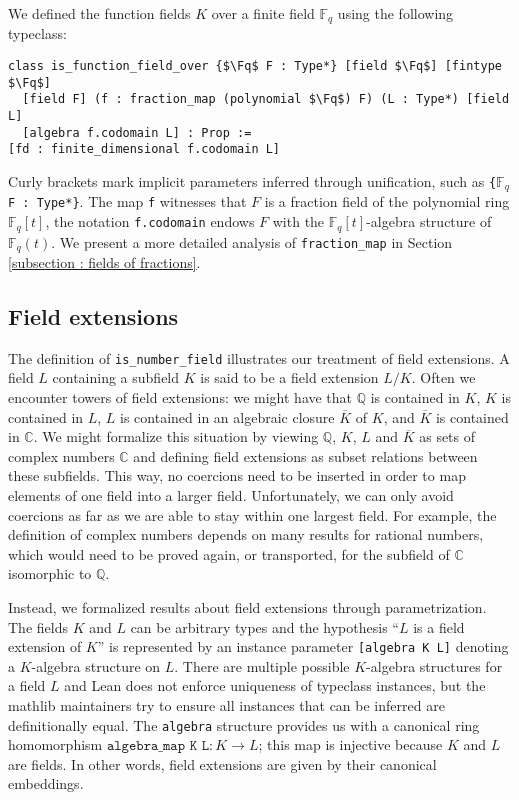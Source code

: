 \documentclass[a4paper,USenglish,cleveref, autoref, thm-restate]{lipics-v2021}
\newcommand{\C}{\mathbb{C}}
\newcommand{\lean}[1]{\texttt{#1}\xspace} %
\newcommand*{\Fq}[1][q]{\mathbb{F}_{#1}}
\newcommand{\mathlib}{\textsf{mathlib}\xspace}
\newcommand{\Q}{\mathbb{Q}}
\begin{document}
We defined the function fields $K$ over a finite field $\Fq$ using the following typeclass:
\begin{lstlisting}
class is_function_field_over {$\Fq$ F : Type*} [field $\Fq$] [fintype $\Fq$]
  [field F] (f : fraction_map (polynomial $\Fq$) F) (L : Type*) [field L]
  [algebra f.codomain L] : Prop :=
[fd : finite_dimensional f.codomain L]
\end{lstlisting}
Curly brackets mark implicit parameters inferred through unification, such as \lean{\{$\Fq$ F : Type*\}}.
The map \lean{f} witnesses that $F$ is a fraction field of the polynomial ring $\Fq[q][t]$,
the notation \lean{f.codomain} endows $F$ with the $\Fq[q][t]$-algebra structure of $\Fq(t)$. We present a more detailed analysis of \lean{fraction\_map} in Section \ref{subsection : fields of fractions}.

\subsection{Field extensions}

The definition of \lean{is\_number\_field} illustrates our treatment of field extensions.
A field $L$ containing a subfield $K$ is said to be a field extension $L / K$.
Often we encounter towers of field extensions: we might have that $\Q$ is contained in $K$, $K$ is contained in $L$, $L$ is contained in an algebraic closure $\overline{K}$ of $K$, and $\overline{K}$ is contained in $\C$.
We might formalize this situation by viewing $\Q$, $K$, $L$ and $\overline{K}$ as sets of complex numbers $\C$ and defining field extensions as subset relations between these subfields.
This way, no coercions need to be inserted in order to map elements of one field into a larger field.
Unfortunately, we can only avoid coercions as far as we are able to stay within one largest field.
For example, the definition of complex numbers depends on many results for rational numbers, which would need to be proved again, or transported, for the subfield of $\C$ isomorphic to $\Q$.

Instead, we formalized results about field extensions through parametrization. The fields $K$ and $L$ can be arbitrary types
and the hypothesis ``$L$ is a field extension of $K$'' is represented by an instance parameter \lean{[algebra K L]} denoting a $K$-algebra structure on $L$.
There are multiple possible $K$-algebra structures for a field $L$ and Lean does not enforce uniqueness of typeclass instances,
but the \mathlib maintainers try to ensure all instances that can be inferred are definitionally equal.
The \lean{algebra} structure provides us with a canonical ring homomorphism $\lean{algebra\_map K L} : K \to L$; this map is injective because $K$ and $L$ are fields.
In other words, field extensions are given by their canonical embeddings.
\end{document}
